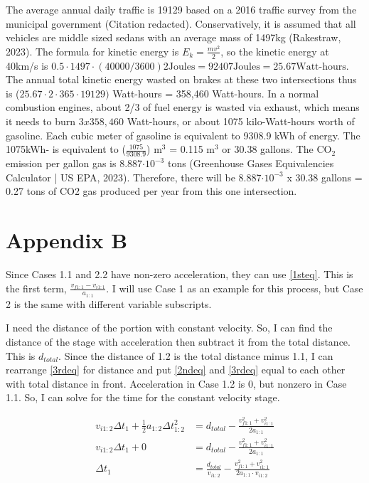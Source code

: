 \documentclass[11pt]{article}
\begin{document}
The average annual daily traffic is 19129 based on a 2016 traffic survey from the municipal government (Citation redacted). Conservatively, it is assumed  that all vehicles are middle sized sedans with an average mass of 1497kg (Rakestraw, 2023). The formula for kinetic energy is $E_k = \tfrac{mv^2}{2}$, so the kinetic energy at 40km/s is $0.5 \cdot 1497 \cdot (40000/3600)2 \text{Joules} = 92407 \text{Joules} = 25.67 \text{Watt-hours}$. The annual total kinetic energy wasted on brakes at these two intersections thus is ($25.67 \cdot 2 \cdot 365 \cdot 19129)$ Watt-hours = 358,460 Watt-hours. In a normal combustion engines, about 2/3 of fuel energy is wasted via exhaust, which means it needs to burn $3 x 358,460$ Watt-hours, or about 1075 kilo-Watt-hours worth of gasoline. Each cubic meter of gasoline is equivalent to 9308.9 kWh of energy. The 1075kWh- is equivalent to ($\tfrac{1075}{9308.9}$) m$^3$ = 0.115 m$^3$ or 30.38 gallons. The CO$_2$ emission per gallon gas is 8.887$\cdot 10^{-3}$ tons (Greenhouse Gases Equivalencies Calculator | US EPA, 2023). Therefore, there will be 8.887$\cdot 10^{-3}$ x 30.38 gallons = 0.27 tons of CO2 gas produced per year from this one intersection. 

\section{Appendix B}

Since Cases 1.1 and 2.2 have non-zero acceleration, they can use \eqref{1steq}. This is the first term, $\frac{v_{f1:1} - v_{i1:1}}{a_{1:1}}$. I will use Case 1 as an example for this process, but Case 2 is the same with different variable subscripts.

I need the distance of the portion with constant velocity. So, I can find the distance of the stage with acceleration then subtract it from the total distance. This is $d_{total}$. Since the distance of 1.2 is the total distance minus 1.1, I can rearrange \eqref{3rdeq} for distance and put \eqref{2ndeq} and \eqref{3rdeq} equal to each other with total distance in front. Acceleration in Case 1.2 is 0, but nonzero in Case 1.1. So, I can solve for the time for the constant velocity stage.

\vspace{-0.5cm}

\begin{align*}
    v_{i1:2}\Delta t_1 + \tfrac{1}{2}a_{1:2}\Delta t^2_{1:2} &= d_{total} - \frac{v_{f1:1}^2 + v_{i1:1}^2}{2a_{1:1}} \\
    v_{i1:2}\Delta t_1 + 0 &= d_{total} - \frac{v_{f1:1}^2 + v_{i1:1}^2}{2a_{1:1}} \\
    \Delta t_1 &= \frac{d_{total}}{v_{i1:2}} - \frac{v_{f1:1}^2 + v_{i1:1}^2}{2a_{1:1} \cdot v_{i1:2}}
\end{align*}
\end{document}
